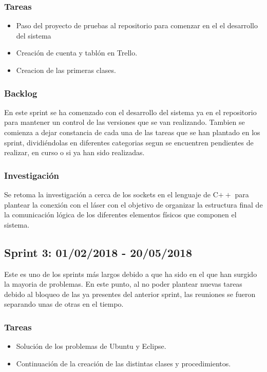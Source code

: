 \subsubsection{Tareas}
\begin{itemize}
	\item Paso del proyecto de pruebas al repositorio para comenzar en el el desarrollo del sistema 
	\item Creación de cuenta y tablón en Trello.
	\item Creacion de las primeras clases.
\end{itemize}
\subsubsection{Backlog}
En este sprint se ha comenzado con el desarrollo del sistema ya en el repositorio para mantener un control de las versiones que se van realizando. Tambien se comienza a dejar constancia de cada una de las tareas que se han plantado en los sprint, dividiéndolas en diferentes categorias segun se encuentren pendientes de realizar, en curso o si ya han sido realizadas.
\subsubsection{Investigación}
Se retoma la investigación a cerca de los sockets en el lenguaje de C$++$ para plantear la conexión con el láser con el objetivo de organizar la estructura final de la comunicación lógica de los diferentes elementos físicos que componen el sistema.

\subsection{Sprint 3: 01/02/2018 - 20/05/2018}
Este es uno de los sprints más largos debido a que ha sido en el que han surgido la mayoria de problemas. En este punto, al no poder plantear nuevas tareas debido al bloqueo de las ya presentes del anterior sprint, las reuniones se fueron separando unas de otras en el tiempo. 
\subsubsection{Tareas}
\begin{itemize}
	\item Solución de los problemas de Ubuntu y Eclipse.
	\item Continuación de la creación de las distintas clases y procedimientos.
\end{itemize}
